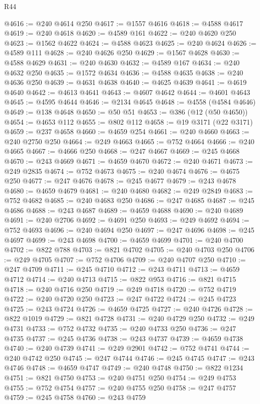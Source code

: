 \begin{lexlean}{R44}
\begin{coremodule}
{@4616 := @240 @4614 @250
@4617 := @1557 @4616
@4618 := @4588 @4617
@4619 := @240 @4618
@4620 := @4589 @161
@4622 := @240 @4620 @250
@4623 := @1562 @4622
@4624 := @4588 @4623
@4625 := @240 @4624
@4626 := @4589 @111
@4628 := @240 @4626 @250
@4629 := @1567 @4628
@4630 := @4588 @4629
@4631 := @240 @4630
@4632 := @4589 @167
@4634 := @240 @4632 @250
@4635 := @1572 @4634
@4636 := @4588 @4635
@4638 := @240 @4636 @250
@4639 := @4631 @4638
@4640 := @4625 @4639
@4641 := @4619 @4640
@4642 := @4613 @4641
@4643 := @4607 @4642
@4644 := @4601 @4643
@4645 := @4595 @4644
@4646 := @2134 @4645
@4648 := @4558 (@4584 @4646)
@4649 := @138 @4648
@4650 := @50 @51
@4653 := @386 (@12 (@50 @4650))
@4654 := @4653 @112
@4655 := @802 @112
@4658 := @19 @3171 (@22 @3171)
@4659 := @237 @4658
@4660 := @4659 @254
@4661 := @240 @4660
@4663 := @240 @2750 @250
@4664 := @249 @4663
@4665 := @752 @4664
@4666 := @240 @4665
@4667 := @4666 @250
@4668 := @247 @4667
@4669 := @245 @4668
@4670 := @243 @4669
@4671 := @4659 @4670
@4672 := @240 @4671
@4673 := @249 @2835
@4674 := @752 @4673
@4675 := @240 @4674
@4676 := @4675 @250
@4677 := @247 @4676
@4678 := @245 @4677
@4679 := @243 @4678
@4680 := @4659 @4679
@4681 := @240 @4680
@4682 := @249 @2849
@4683 := @752 @4682
@4685 := @240 @4683 @250
@4686 := @247 @4685
@4687 := @245 @4686
@4688 := @243 @4687
@4689 := @4659 @4688
@4690 := @240 @4689
@4691 := @240 @2706
@4692 := @4691 @250
@4693 := @249 @4692
@4694 := @752 @4693
@4696 := @240 @4694 @250
@4697 := @247 @4696
@4698 := @245 @4697
@4699 := @243 @4698
@4700 := @4659 @4699
@4701 := @240 @4700
@4702 := @822 @788
@4703 := @821 @4702
@4705 := @240 @4703 @250
@4706 := @249 @4705
@4707 := @752 @4706
@4709 := @240 @4707 @250
@4710 := @247 @4709
@4711 := @245 @4710
@4712 := @243 @4711
@4713 := @4659 @4712
@4714 := @240 @4713
@4715 := @822 @953
@4716 := @821 @4715
@4718 := @240 @4716 @250
@4719 := @249 @4718
@4720 := @752 @4719
@4722 := @240 @4720 @250
@4723 := @247 @4722
@4724 := @245 @4723
@4725 := @243 @4724
@4726 := @4659 @4725
@4727 := @240 @4726
@4728 := @822 @1019
@4729 := @821 @4728
@4731 := @240 @4729 @250
@4732 := @249 @4731
@4733 := @752 @4732
@4735 := @240 @4733 @250
@4736 := @247 @4735
@4737 := @245 @4736
@4738 := @243 @4737
@4739 := @4659 @4738
@4740 := @240 @4739
@4741 := @249 @2901
@4742 := @752 @4741
@4744 := @240 @4742 @250
@4745 := @247 @4744
@4746 := @245 @4745
@4747 := @243 @4746
@4748 := @4659 @4747
@4749 := @240 @4748
@4750 := @822 @1234
@4751 := @821 @4750
@4753 := @240 @4751 @250
@4754 := @249 @4753
@4755 := @752 @4754
@4757 := @240 @4755 @250
@4758 := @247 @4757
@4759 := @245 @4758
@4760 := @243 @4759
}
\end{coremodule}
\end{lexlean}
